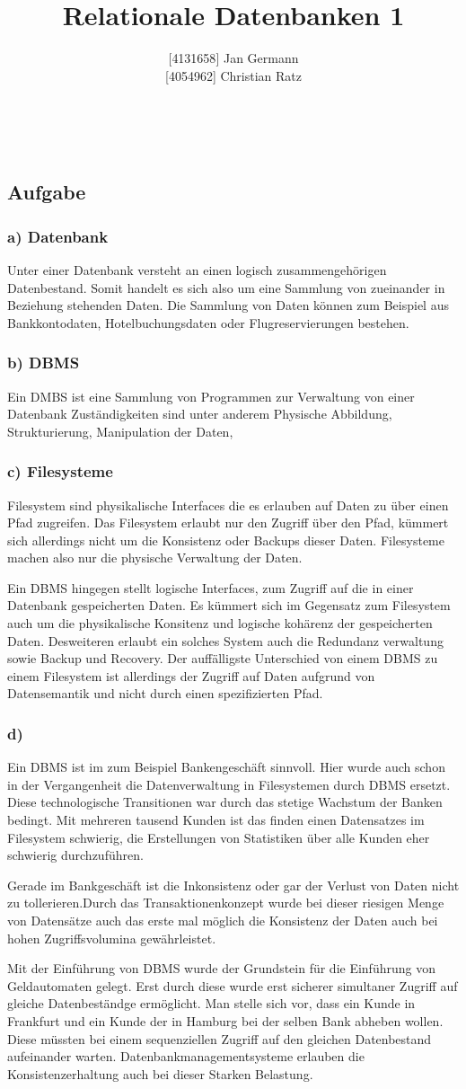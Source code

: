 \documentclass[12pt,a4paper,DIV=9]{scrartcl}
\author{{[}4131658{]} Jan Germann \\{[}4054962{]} Christian Ratz}
\title{Relationale Datenbanken 1}
\newcounter{temp}
\newcommand{\aufgabe}[1]{
  \setcounter{temp}{\value{subsection}}
  \setcounter{subsection}{#1}
  \addtocounter{subsection}{-1}
  \subsection{Aufgabe}
  \setcounter{subsection}{\value{temp}}
}
\newcommand{\teil}[2][]{
  \subsubsection*{#2) #1}
}
\renewcommand{\author}[1]{\renewcommand{\author}{#1}}
\renewcommand{\title}[1]{\renewcommand{\title}{#1}}
\newcommand{\makehomeworktitle}{
  \begin{minipage}{6.5cm}
    \sf{\author}
  \end{minipage}
  \begin{minipage}{6.5cm}
    \begin{flushright}
      \sf{\title\\\today}
    \end{flushright}
  \end{minipage}
  \\[0.2cm]
  \begin{center}
    \sf{
      \color{blue}{
        \LARGE{Aufgabenblatt \blattnr}
      }
    }
  \end{center}
  \vspace{0.1cm}
}
\begin{document}
\makehomeworktitle

\aufgabe{2}
\teil[Datenbank]{a}
Unter einer Datenbank versteht an einen logisch zusammengehörigen Datenbestand. Somit handelt es sich also um eine Sammlung von zueinander in Beziehung stehenden Daten. Die Sammlung von Daten können zum Beispiel aus Bankkontodaten, Hotelbuchungsdaten oder Flugreservierungen bestehen.

\teil[DBMS]{b}
  Ein DMBS ist eine Sammlung von Programmen zur Verwaltung von einer Datenbank
Zuständigkeiten sind unter anderem Physische Abbildung, Strukturierung, Manipulation der Daten,

\teil[Filesysteme]{c}
  Filesystem sind physikalische Interfaces die es erlauben auf Daten zu über einen Pfad zugreifen. Das Filesystem erlaubt nur den Zugriff über den Pfad, kümmert sich allerdings nicht um die Konsistenz oder Backups dieser Daten. Filesysteme machen also nur die physische Verwaltung der Daten.

  Ein DBMS hingegen stellt logische Interfaces, zum Zugriff auf die in einer Datenbank gespeicherten Daten. Es kümmert sich im Gegensatz zum Filesystem auch um die physikalische Konsitenz und logische kohärenz der gespeicherten Daten. Desweiteren erlaubt ein solches System auch die Redundanz verwaltung sowie Backup und Recovery. Der auffälligste Unterschied von einem DBMS zu einem Filesystem ist allerdings der Zugriff auf Daten aufgrund von Datensemantik und nicht durch einen spezifizierten Pfad.

\teil{d}
  Ein DBMS ist im zum Beispiel Bankengeschäft sinnvoll. Hier wurde auch schon in der Vergangenheit die Datenverwaltung in Filesystemen durch DBMS ersetzt. Diese technologische Transitionen war durch das stetige Wachstum der Banken bedingt. Mit mehreren tausend Kunden ist das finden einen Datensatzes im Filesystem schwierig, die Erstellungen von Statistiken über alle Kunden eher schwierig durchzuführen.

  Gerade im Bankgeschäft ist die Inkonsistenz oder gar der Verlust von Daten nicht zu tollerieren.Durch das Transaktionenkonzept wurde bei dieser riesigen Menge von Datensätze auch das erste mal möglich die Konsistenz der Daten auch bei hohen Zugriffsvolumina gewährleistet.

  Mit der Einführung von DBMS wurde der Grundstein für die Einführung von Geldautomaten gelegt. Erst durch diese wurde erst sicherer simultaner Zugriff auf gleiche Datenbeständge ermöglicht. Man stelle sich vor, dass ein Kunde in Frankfurt und ein Kunde der in Hamburg bei der selben Bank abheben wollen. Diese müssten bei einem sequenziellen Zugriff auf den gleichen Datenbestand aufeinander warten. Datenbankmanagementsysteme erlauben die Konsistenzerhaltung auch bei dieser Starken Belastung.
\end{document}
